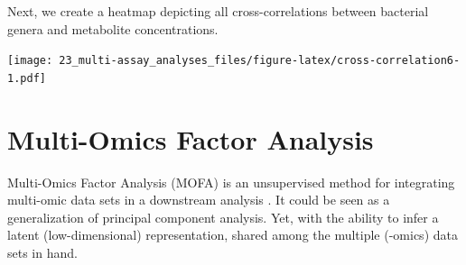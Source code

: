 \documentclass[
]{book}
\newenvironment{Shaded}{\begin{snugshade}}{\end{snugshade}}
\newcommand{\AttributeTok}[1]{\textcolor[rgb]{0.77,0.63,0.00}{#1}}
\newcommand{\CommentTok}[1]{\textcolor[rgb]{0.56,0.35,0.01}{\textit{#1}}}
\newcommand{\ControlFlowTok}[1]{\textcolor[rgb]{0.13,0.29,0.53}{\textbf{#1}}}
\newcommand{\DecValTok}[1]{\textcolor[rgb]{0.00,0.00,0.81}{#1}}
\newcommand{\FloatTok}[1]{\textcolor[rgb]{0.00,0.00,0.81}{#1}}
\newcommand{\FunctionTok}[1]{\textcolor[rgb]{0.00,0.00,0.00}{#1}}
\newcommand{\NormalTok}[1]{#1}
\newcommand{\OtherTok}[1]{\textcolor[rgb]{0.56,0.35,0.01}{#1}}
\newcommand{\SpecialCharTok}[1]{\textcolor[rgb]{0.00,0.00,0.00}{#1}}
\newcommand{\StringTok}[1]{\textcolor[rgb]{0.31,0.60,0.02}{#1}}
\begin{document}
Next, we create a heatmap depicting all cross-correlations between bacterial
genera and metabolite concentrations.

\begin{Shaded}
\end{Shaded}

\texttt{[image: 23\_multi-assay\_analyses\_files/figure-latex/cross-correlation6-1.pdf]}

\hypertarget{mofa}{%
\section{Multi-Omics Factor Analysis}\label{mofa}}

Multi-Omics Factor Analysis (MOFA) is an unsupervised method for integrating multi-omic data sets in a downstream analysis \citep{Argelaguet2018}. It could be
seen as a generalization of principal component analysis. Yet, with the ability
to infer a latent (low-dimensional) representation, shared among the multiple
(-omics) data sets in hand.
\end{document}
